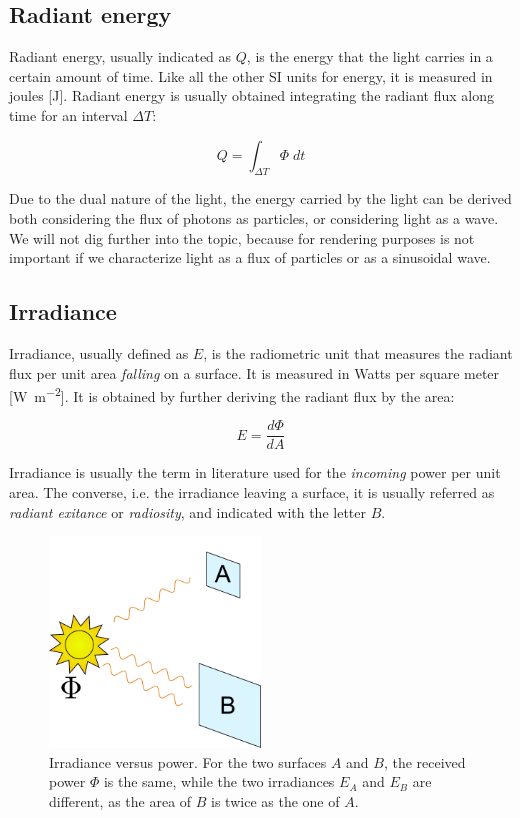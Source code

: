 \subsection{Radiant energy}
Radiant energy, usually indicated as $Q$, is the energy that the light carries in a certain amount of time. Like all the other SI units for energy, it is measured in joules [\si{\joule}]. Radiant energy is usually obtained integrating the radiant flux along time for an interval $\Delta T$:

$$
Q = \int_{\Delta T} \Phi \; dt
$$

Due to the dual nature of the light, the energy carried by the light can be derived both considering the flux of photons as particles, or considering light as a wave. We will not dig further into the topic, because for rendering purposes is not important if we characterize light as a flux of particles or as a sinusoidal wave.

\subsection{Irradiance}

Irradiance, usually defined as $E$, is the radiometric unit that measures the radiant flux per unit area \emph{falling} on a surface. It is measured in Watts per square meter [\si{\watt\per\square\meter}]. It is obtained by further deriving the radiant flux by the area:

$$
E = \frac{d\Phi}{dA}
$$

Irradiance is usually the term in literature used for the \emph{incoming} power per unit area. The converse, i.e. the irradiance leaving a surface, it is usually referred as \emph{radiant exitance} or \emph{radiosity}, and indicated with the letter $B$.

\begin{figure}[!ht]
\centering
\includegraphics[width=0.5\textwidth]{images/irradiance.pdf}
\caption{Irradiance versus power. For the two surfaces $A$ and $B$, the received power $\Phi$ is the same, while the two irradiances $E_A$ and $E_B$ are different, as the area of $B$ is twice as the one of $A$.}
\label{fig:spectrum}
\end{figure}
 

